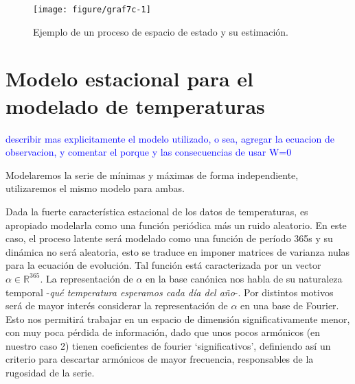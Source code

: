 \documentclass[12pt]{article}\usepackage[]{graphicx}\usepackage[]{color}
\newenvironment{knitrout}{}{} %
\newcommand{\RR}{\mathbb{R}}
\begin{document}
\begin{knitrout}
\color{fgcolor}\begin{figure}

{\centering \texttt{[image: figure/graf7c-1]} 

}

\caption[Ejemplo de un proceso de espacio de estado y su estimación]{Ejemplo de un proceso de espacio de estado y su estimación.}\label{fig:graf7c}
\end{figure}


\end{knitrout}



\newcommand{\thetaline}{\raisebox{2pt}{\tikz{\draw[-,theta,-,line width = 0.9pt](0,0) -- (5mm,0); }}\;}
\newcommand{\yeline}{\raisebox{2pt}{\tikz{\draw[-,ye,-,line width = 0.9pt](0,0) -- (5mm,0); }}\;}





\section{Modelo estacional para el modelado de temperaturas}\label{DLMtemp}
\textcolor{blue}{describir mas explicitamente el modelo utilizado, o sea, agregar la ecuacion de observacion, y comentar el porque y las consecuencias de usar W=0}

Modelaremos la serie de mínimas y máximas de forma independiente, utilizaremos el mismo modelo para ambas.

Dada la fuerte característica estacional de los datos de temperaturas, es apropiado modelarla como una función periódica más un ruido aleatorio. En este caso, el proceso latente será modelado como una función de período 365s y su dinámica no será aleatoria, esto se traduce en imponer matrices de varianza nulas para la ecuación de evolución.
Tal función está caracterizada por un vector $\alpha \in \RR^{365}$. La representación de $\alpha$ en la base canónica nos habla de su naturaleza temporal -\textit{qué temperatura esperamos cada día del año}-. Por distintos motivos será de mayor interés considerar la representación de $\alpha$ en una base de Fourier. Esto nos permitirá trabajar en un espacio de dimensión significativamente menor, con muy poca pérdida de información, dado que unos pocos armónicos (en nuestro caso 2) tienen coeficientes de fourier `significativos', definiendo así un criterio para descartar armónicos de mayor frecuencia, responsables de la rugosidad de la serie.
\end{document}
